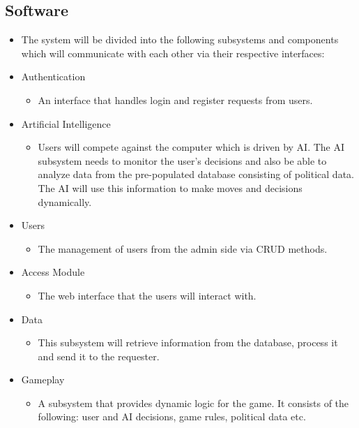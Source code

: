 \documentclass{article}
\begin{document}
    \subsection{Software}
    \begin{itemize}
    \item The system will be divided into the following subsystems and components which will communicate with each other via their respective interfaces:

    	\item Authentication  
	    \begin{itemize}
				\item An interface that handles login and register requests from users.
		\end{itemize}

		\item Artificial Intelligence 
   		\begin{itemize}
				\item Users will compete against the computer which is driven by AI. The AI subsystem needs to monitor the user's decisions and also be able to analyze data from the pre-populated database consisting of political data. The AI will use this information to make moves and decisions dynamically.
		\end{itemize}

		\item Users 
		\begin{itemize}
				\item The management of users from the admin side via CRUD methods.   		
		\end{itemize}

		\item Access Module 
		\begin{itemize}
				\item The web interface that the users will interact with.		
		\end{itemize}

		\item Data
		\begin{itemize}
				\item This subsystem will retrieve information from the database, process it and send it to the requester.
		\end{itemize}

		\item Gameplay
		\begin{itemize}
				\item A subsystem that provides dynamic logic for the game. It consists of the following: user and AI decisions, game rules, political data etc.
		\end{itemize}
	\end{itemize}
	
\end{document}
